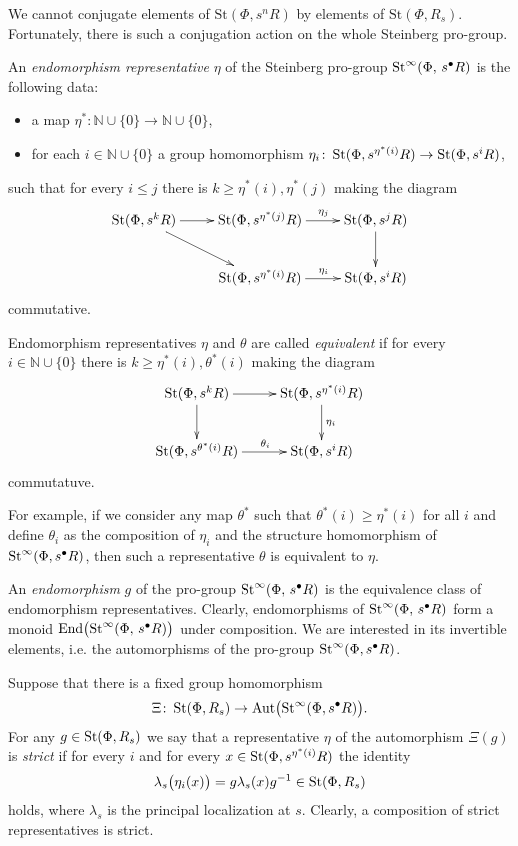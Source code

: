 \documentclass[oneside, 11pt]{amsart}
\begin{document}
We cannot conjugate elements of $\mathrm{St}(\Phi, s^nR)$ by elements of $\mathrm{St}(\Phi, R_s)$. Fortunately, there is such a conjugation action on the whole Steinberg pro-group.

\begin{df}
An {\it endomorphism representative} $\eta$ of the Steinberg pro-group $\mathop{\mathrm{St}}\nolimits^\infty(\Phi,\,s^\bullet R)$ is the following data: 
\begin{itemize}
\item
a map $\eta^* \colon \mathbb N \cup \{0\} \to \mathbb N \cup \{0\}$,
\item
for each $i \in \mathbb N \cup \{0\}$ a group homomorphism $\eta_i \colon \mathop{\mathrm{St}}\nolimits(\Phi, s^{\eta^*(i)} R) \to \mathop{\mathrm{St}}\nolimits(\Phi, s^i R)$,
\end{itemize}
such that for every $i \leq j$ there is $k \geq \eta^*(i), \eta^*(j)$ making the diagram
$$
\xymatrix{
\St(\Phi, s^k R) \ar[r] \ar[rd] & \St(\Phi, s^{\eta^*(j)} R)\ar[r]^(0.55){\eta_j} & \St(\Phi, s^j R) \ar[d]\\
&\St(\Phi, s^{\eta^*(i)} R) \ar[r]^(0.55){\eta_i} & \St(\Phi, s^i R)
}
$$
commutative.

Endomorphism representatives $\eta$ and $\theta$ are called {\it equivalent} if for every $i \in \mathbb N \cup \{0\}$ there is $k \geq \eta^*(i), \theta^*(i)$ making the diagram
$$
\xymatrix{
\St(\Phi, s^k R)\ar[r]\ar[d] & \St(\Phi, s^{\eta^*(i)} R) \ar[d]^{\eta_i}\\
\St(\Phi, s^{\theta^*(i)} R) \ar[r]^(0.55){\theta_i} & \St(\Phi, s^i R)
}
$$
commutatuve.

For example, if we consider any map $\theta^*$ such that $\theta^*(i) \geq \eta^*(i)$ for all $i$ and define $\theta_i$ as the composition of $\eta_i$ and the structure homomorphism of $\mathop{\mathrm{St}}\nolimits^\infty(\Phi, s^\bullet R)$, then such a representative $\theta$ is equivalent to $\eta$.

An {\it endomorphism} $g$ of the pro-group $\mathop{\mathrm{St}}\nolimits^\infty(\Phi,\,s^\bullet R)$ is the equivalence class of endomorphism representatives. Clearly, endomorphisms of $\mathop{\mathrm{St}}\nolimits^\infty(\Phi,\,s^\bullet R)$ form a monoid $\mathrm{End}\bigl(\mathop{\mathrm{St}}\nolimits^\infty(\Phi,\,s^\bullet R)\bigr)$ under composition. We are interested in its invertible elements, i.e. the automorphisms of the pro-group \(\mathop{\mathrm{St}}\nolimits^\infty(\Phi, s^\bullet R)\).

Suppose that there is a fixed group homomorphism $$\Xi \colon \mathop{\mathrm{St}}\nolimits(\Phi, R_s) \to \mathrm{Aut}\bigl(\mathop{\mathrm{St}}\nolimits^\infty(\Phi, s^\bullet R)\bigr).$$ For any $g \in \mathop{\mathrm{St}}\nolimits(\Phi, R_s)$ we say that a representative $\eta$ of the automorphism $\Xi(g)$ is {\it strict} if for every $i$ and for every $x \in \mathop{\mathrm{St}}\nolimits(\Phi, s^{\eta^*(i)} R)$ the identity
$$
\lambda_s\bigl(\eta_i(x)\bigr) = g \lambda_s(x) g^{-1} \in \mathop{\mathrm{St}}\nolimits(\Phi, R_s)
$$
holds, where $\lambda_s$ is the principal localization at $s$. Clearly, a composition of strict representatives is strict.
\end{df}
\end{document}

